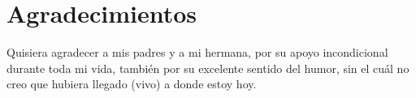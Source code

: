 \documentclass[12pt,twoside,titlepage]{report}
\newcommand{\nombreautor}{Ángel Baeza Sánchez}
\newcommand{\nombretutor}{Aarón Sújar Garrido}
\newcommand{\titulotrabajo}{Herramienta de Prototipado de Videojuegos Plug \& Play}
\newcommand{\escuelalargo}{Escuela Técnica Superior de Ingeniería Informática}
\newcommand{\universidad}{Universidad Rey Juan Carlos}
\newcommand{\fecha}{Fecha}
\newcommand\blankpage{%
    \newpage
    \null
    \thispagestyle{empty}%
    \newpage}
\begin{document}








\hypersetup{pageanchor=true}

\normalsize
\afterpage{\blankpage} %






\setlength{\parskip}{0.75em}
\renewcommand{\baselinestretch}{1.25}

\setcounter{page}{2}



\chapter*{Agradecimientos}

Quisiera agradecer a mis padres y a mi hermana, por su apoyo incondicional durante toda mi vida, también por su excelente sentido del humor, sin el cuál no creo que hubiera llegado (vivo) a donde estoy hoy.
\end{document}
